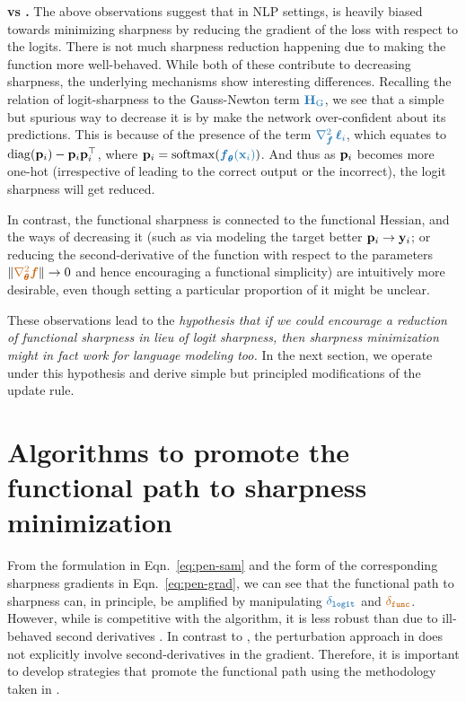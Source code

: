 \textbf{ vs .} The above observations suggest that in NLP settings, \SAM is heavily biased towards minimizing sharpness
by reducing the gradient of the loss with respect to the logits. There is not much sharpness reduction happening due to making the function more well-behaved. While both of these contribute to decreasing sharpness, the underlying mechanisms show interesting differences. Recalling the relation of logit-sharpness to the Gauss-Newton term $\lcolor{\HG}$, we see that a simple but spurious way to decrease it is by make the network over-confident about its predictions. This is because of the presence of the term $\lcolor{\nabla^2_{\boldsymbol{f}} \,\ellbold_i}$, which equates to $\operatorname{diag}({\mathbf p}_i) - {\mathbf p}_i{\mathbf p}_i^\top$, where $\pb_i = \softmax(\lcolor{\boldsymbol{f}_\btheta(\x_i)})$. And thus as ${\mathbf p}_i$ becomes more one-hot (irrespective of leading to the correct output or the incorrect), the logit sharpness will get reduced. 

In contrast, the functional sharpness is connected to the functional Hessian, and the ways of decreasing it (such as via modeling the target better ${\mathbf p}_i \rightarrow \mathbf y_i$; or reducing the second-derivative of the function with respect to the parameters $\|\fcolor{\nabla^2_\btheta \boldsymbol{f}}\|\rightarrow 0$ and hence encouraging a functional simplicity) are  intuitively more desirable, even though setting a particular proportion of it might be unclear. 

These observations lead to the \textit{hypothesis that if we could encourage a reduction of functional sharpness in lieu of logit sharpness, then sharpness minimization might in fact work for language modeling too. }In the next section, we operate under this hypothesis and derive simple but principled modifications of the \SAM update rule. 











\section{Algorithms to promote the functional path to sharpness minimization}\label{sec:algos}


From the \penaltySAM formulation in Eqn.~\ref{eq:pen-sam} and the form of the corresponding sharpness gradients in Eqn.~\ref{eq:pen-grad}, we can see that the functional path to sharpness can, in principle, be amplified by manipulating $\lcolor{\glog}$ and $\fcolor{\gfun}$.
However, while \penaltySAM is competitive with the \SAM algorithm, it is less robust than \SAM due to ill-behaved second derivatives
\cite{dauphin2024neglected}. In contrast to \penaltySAM, the perturbation approach in \SAM does not explicitly involve second-derivatives in the gradient. Therefore, it is important to develop strategies that promote the functional path using the methodology taken in \SAM. %

